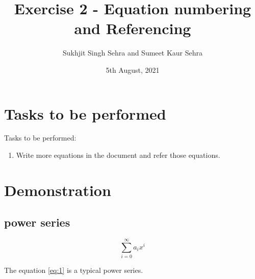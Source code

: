\documentclass{article}
\title{Exercise 2 - Equation numbering and Referencing}
\author{Sukhjit Singh Sehra and Sumeet Kaur Sehra}
\date{5th August, 2021}
\begin{document}
	\maketitle
		\section*{Tasks to be performed}
	Tasks to be performed:
	\begin{enumerate}
		\item Write more equations in the document and refer those equations.
	\end{enumerate}
\section*{Demonstration}

 
\subsection*{power series} 
 
\begin{equation} \label{eq:1}
\sum_{i=0}^{\infty} a_i x^i
\end{equation}
 
The equation \ref{eq:1} is a typical power series.
\end{document}
